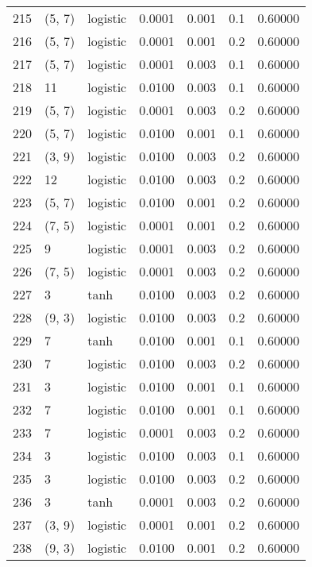 \begin{tabular}{lllrrrr}
215 &      (5, 7) &  logistic &  0.0001 &  0.001 &  0.1 &   0.60000 \\
216 &      (5, 7) &  logistic &  0.0001 &  0.001 &  0.2 &   0.60000 \\
217 &      (5, 7) &  logistic &  0.0001 &  0.003 &  0.1 &   0.60000 \\
218 &          11 &  logistic &  0.0100 &  0.003 &  0.1 &   0.60000 \\
219 &      (5, 7) &  logistic &  0.0001 &  0.003 &  0.2 &   0.60000 \\
220 &      (5, 7) &  logistic &  0.0100 &  0.001 &  0.1 &   0.60000 \\
221 &      (3, 9) &  logistic &  0.0100 &  0.003 &  0.2 &   0.60000 \\
222 &          12 &  logistic &  0.0100 &  0.003 &  0.2 &   0.60000 \\
223 &      (5, 7) &  logistic &  0.0100 &  0.001 &  0.2 &   0.60000 \\
224 &      (7, 5) &  logistic &  0.0001 &  0.001 &  0.2 &   0.60000 \\
225 &           9 &  logistic &  0.0001 &  0.003 &  0.2 &   0.60000 \\
226 &      (7, 5) &  logistic &  0.0001 &  0.003 &  0.2 &   0.60000 \\
227 &           3 &      tanh &  0.0100 &  0.003 &  0.2 &   0.60000 \\
228 &      (9, 3) &  logistic &  0.0100 &  0.003 &  0.2 &   0.60000 \\
229 &           7 &      tanh &  0.0100 &  0.001 &  0.1 &   0.60000 \\
230 &           7 &  logistic &  0.0100 &  0.003 &  0.2 &   0.60000 \\
231 &           3 &  logistic &  0.0100 &  0.001 &  0.1 &   0.60000 \\
232 &           7 &  logistic &  0.0100 &  0.001 &  0.1 &   0.60000 \\
233 &           7 &  logistic &  0.0001 &  0.003 &  0.2 &   0.60000 \\
234 &           3 &  logistic &  0.0100 &  0.003 &  0.1 &   0.60000 \\
235 &           3 &  logistic &  0.0100 &  0.003 &  0.2 &   0.60000 \\
236 &           3 &      tanh &  0.0001 &  0.003 &  0.2 &   0.60000 \\
237 &      (3, 9) &  logistic &  0.0001 &  0.001 &  0.2 &   0.60000 \\
238 &      (9, 3) &  logistic &  0.0100 &  0.001 &  0.2 &   0.60000 \\

\end{tabular}
